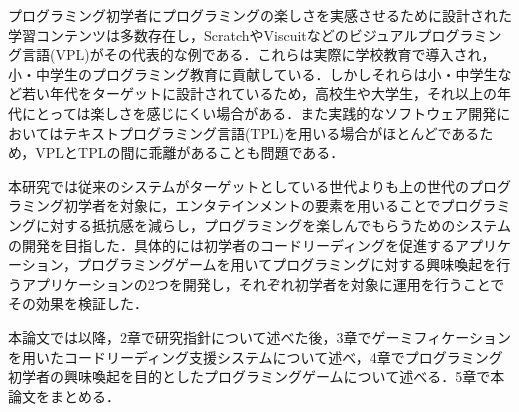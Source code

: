 プログラミング初学者にプログラミングの楽しさを実感させるために設計された学習コンテンツは多数存在し，ScratchやViscuitなどのビジュアルプログラミング言語(VPL)がその代表的な例である．これらは実際に学校教育で導入され，小・中学生のプログラミング教育に貢献している．しかしそれらは小・中学生など若い年代をターゲットに設計されているため，高校生や大学生，それ以上の年代にとっては楽しさを感じにくい場合がある．また実践的なソフトウェア開発においてはテキストプログラミング言語(TPL)を用いる場合がほとんどであるため，VPLとTPLの間に乖離があることも問題である．

本研究では従来のシステムがターゲットとしている世代よりも上の世代のプログラミング初学者を対象に，エンタテインメントの要素を用いることでプログラミングに対する抵抗感を減らし，プログラミングを楽しんでもらうためのシステムの開発を目指した．具体的には初学者のコードリーディングを促進するアプリケーション，プログラミングゲームを用いてプログラミングに対する興味喚起を行うアプリケーションの2つを開発し，それぞれ初学者を対象に運用を行うことでその効果を検証した．


本論文では以降，2章で研究指針について述べた後，3章でゲーミフィケーションを用いたコードリーディング支援システムについて述べ，4章でプログラミング初学者の興味喚起を目的としたプログラミングゲームについて述べる．5章で本論文をまとめる．